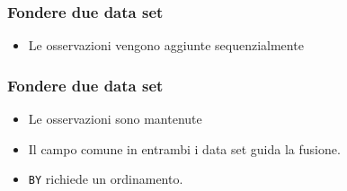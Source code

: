 \begin{frame}[containsverbatim]\frametitle{Fondere due data set}
  \begin{itemize}
  \item
    Le osservazioni vengono aggiunte sequenzialmente
  \end{itemize}
\end{frame}



\begin{frame}[containsverbatim]\frametitle{Fondere due data set}
  \begin{itemize}
  \item
    Le osservazioni sono mantenute
  \item
    Il campo comune in entrambi i data set guida la fusione.
  \item
    \verb+BY+ richiede un ordinamento.
  \end{itemize}
\end{frame}












